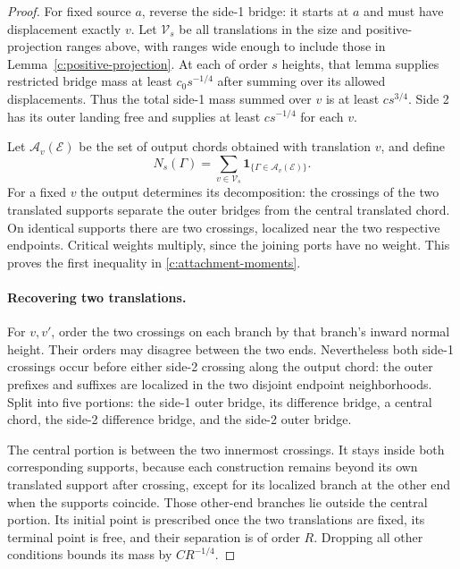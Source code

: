 \documentclass[11pt]{article}
\numberwithin{equation}{section}
\theoremstyle{definition}\newtheorem{definition}[theorem]{Definition}
\theoremstyle{remark}\newtheorem{remark}[theorem]{Remark}
\begin{document}
\begin{proof}
For fixed source $a$, reverse the side-1 bridge: it starts at $a$ and
must have displacement exactly $v$. Let $\mathcal V_s$ be all translations
in the size and positive-projection ranges above, with ranges wide enough
to include those in Lemma~\ref{c:positive-projection}. At each of order
$s$ heights, that lemma supplies restricted bridge mass at least
$c_0s^{-1/4}$ after summing over its allowed displacements. Thus the
total side-1 mass summed over $v$ is at least $cs^{3/4}$. Side 2 has
its outer landing free and supplies at least $cs^{-1/4}$ for each $v$.

Let $\mathcal A_v(\mathcal E)$ be the set of output chords obtained with
translation $v$, and define
\[
 N_s(\Gamma)=\sum_{v\in\mathcal V_s}
              \mathbf1_{\{\Gamma\in\mathcal A_v(\mathcal E)\}}.
\]
For a fixed $v$ the output determines its decomposition: the crossings
of the two translated supports separate the outer bridges from the
central translated chord. On identical supports there are two crossings,
localized near the two respective endpoints. Critical weights multiply,
since the joining ports have no weight. This proves the first inequality
in \eqref{c:attachment-moments}.

\paragraph{Recovering two translations.}
For $v,v'$, order the two crossings on each branch by that branch's
inward normal height. Their orders may disagree between the two ends.
Nevertheless both side-1 crossings occur before either side-2 crossing
along the output chord: the outer prefixes and suffixes are localized
in the two disjoint endpoint neighborhoods. Split into five portions:
the side-1 outer bridge, its difference bridge, a central chord, the
side-2 difference bridge, and the side-2 outer bridge.

The central portion is between the two innermost crossings. It stays
inside both corresponding supports, because each construction remains
beyond its own translated support after crossing, except for its
localized branch at the other end when the supports coincide. Those
other-end branches lie outside the central portion. Its initial point
is prescribed once the two translations are fixed, its terminal point
is free, and their separation is of order $R$. Dropping all other
conditions bounds its mass by $CR^{-1/4}$.


\end{proof}
\end{document}
